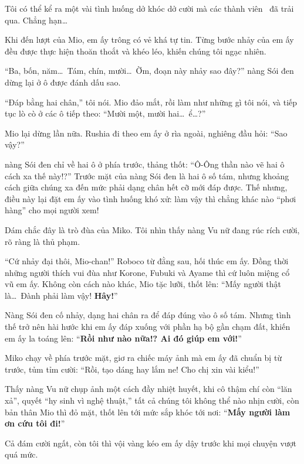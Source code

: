 \documentclass[../main.tex]{subfiles}
\begin{document}
Tôi có thể kể ra một vài tình huống dở khóc dở cười mà các thành viên \hll\ đã trải qua. Chẳng hạn\dots

\il

Khi đến lượt của Mio, em ấy trông có vẻ khá tự tin. Từng bước nhảy của em ấy đều được thực hiện thoăn thoắt và khéo léo, khiến chúng tôi ngạc nhiên.

``Ba, bốn, năm\dots\ Tám, chín, mười\dots\ Ờm, đoạn này nhảy sao đây?'' nàng Sói đen dừng lại ở ô được đánh dấu sao.

``Đáp bằng hai chân,'' tôi nói. Mio đảo mắt, rồi làm như những gì tôi nói, và tiếp tục lò cò ở các ô tiếp theo: ``Mười một, mười hai\dots\ ể\dots?''

Mio lại dừng lần nữa. Rushia đi theo em ấy ở rìa ngoài, nghiêng đầu hỏi: ``Sao vậy?''

nàng Sói đen chỉ về hai ô ở phía trước, thảng thốt: ``Ô-Ông thần nào vẽ hai ô cách xa thế này!?'' Trước mặt của nàng Sói đen là hai ô số tám, nhưng khoảng cách giữa chúng xa đến mức phải dạng chân hết cỡ mới đáp được. Thế nhưng, điều này lại đặt em ấy vào tình huống khó xử: làm vậy thì chẳng khác nào ``phơi hàng'' cho mọi người xem!

Dám chắc đây là trò đùa của Miko. Tôi nhìn thấy nàng Vu nữ đang rúc rích cười, rõ ràng là thủ phạm.

``Cứ nhảy đại thôi, Mio-chan!'' Roboco từ đằng sau, hối thúc em ấy. Đồng thời những người thích vui đùa như Korone, Fubuki và Ayame thì cứ luôn miệng cổ vũ em ấy. Không còn cách nào khác, Mio tặc lưỡi, thốt lên: ``Mấy người thật là\dots\ Đành phải làm vậy! \textbf{Hây!}''

Nàng Sói đen cố nhảy, dạng hai chân ra để đáp đúng vào ô số tám. Nhưng tình thế trở nên hài hước khi em ấy đáp xuống với phần hạ bộ gần chạm đất, khiến em ấy la toáng lên: ``\textbf{Rồi như nào nữa!? Ai đó giúp em với!}''

Miko chạy về phía trước mặt, giơ ra chiếc máy ảnh mà em ấy đã chuẩn bị từ trước, tủm tỉm cười: ``Rồi, tạo dáng hay lắm ne! Cho chị xin vài kiểu!''

Thấy nàng Vu nữ chụp ảnh một cách đầy nhiệt huyết, khi cô thậm chí còn ``lăn xả'', quyết ``hy sinh vì nghệ thuật,'' tất cả chúng tôi không thể nào nhịn cười, còn bản thân Mio thì đỏ mặt, thốt lên tới mức sắp khóc tới nơi: ``\textbf{Mấy người làm ơn cứu tôi đi!}''

Cả đám cười ngất, còn tôi thì vội vàng kéo em ấy dậy trước khi mọi chuyện vượt quá mức.

\ct
\end{document}
